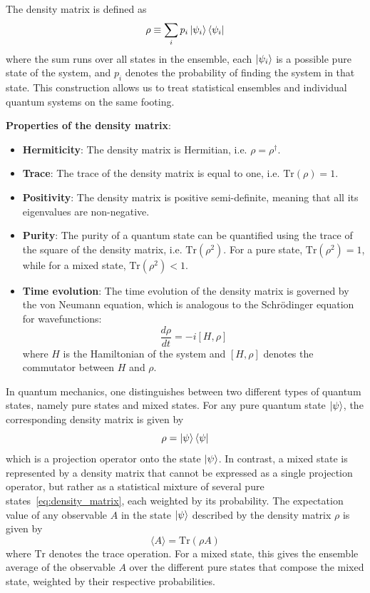 \documentclass[12pt,oneside,openright]{report}
\theoremstyle{definition}
\theoremstyle{plain}
\theoremstyle{remark}
\begin{document}
The density matrix is defined as 
\begin{equation}{\label{eq:density_matrix}}
\rho \equiv \sum_{i} p_i \ket{\psi_i} \bra{\psi_i}
\end{equation}
where the sum runs over all states in the ensemble, each $\ket{\psi_i}$ is a possible pure state of the system, and $p_i$ denotes the probability of
finding the system in that state. This construction allows us to treat statistical ensembles and individual quantum systems on the same footing.

\textbf{Properties of the density matrix}:
\begin{itemize}
\item \textbf{Hermiticity}: The density matrix is Hermitian, i.e. $\rho = \rho^{\dagger}$.
\item \textbf{Trace}: The trace of the density matrix is equal to one, i.e. $\text{Tr}(\rho) = 1$.
\item \textbf{Positivity}: The density matrix is positive semi-definite, meaning that all its eigenvalues are non-negative.
\item \textbf{Purity}: The purity of a quantum state can be quantified using the trace of the square of the density matrix, i.e. $\text{Tr}(\rho^2)$. For a pure state, $\text{Tr}(\rho^2) = 1$, while for a mixed state, $\text{Tr}(\rho^2) < 1$.
\item \textbf{Time evolution}: The time evolution of the density matrix is governed by the von Neumann equation, which is analogous to the Schrödinger equation for wavefunctions:
\begin{equation}
\frac{d\rho}{dt} = -i[H,\rho]
\end{equation}
where $H$ is the Hamiltonian of the system and $[H,\rho]$ denotes the commutator between $H$ and $\rho$.
\end{itemize}
In quantum mechanics, one distinguishes between two different types of quantum states, namely pure states and mixed states.
For any pure quantum state $ \ket{\psi} $, the corresponding density matrix is given by
\begin{equation}
\rho = \ket{\psi} \bra{\psi}
\end{equation}
which is a projection operator onto the state $ \ket{\psi} $. In contrast, a mixed state is represented by 
a density matrix that cannot be expressed as a single projection operator, 
but rather as a statistical mixture of several pure states~\eqref{eq:density_matrix}, each weighted by its probability.
The expectation value of any observable $A$ in the state $\ket{\psi}$ described by the density matrix $\rho$ is given by
\begin{equation}
\langle A \rangle = \text{Tr}(\rho A)
\end{equation}
where $\text{Tr}$ denotes the trace operation.
For a mixed state, this gives the ensemble average of the observable $A$ over the different pure states that compose the mixed state, weighted by their respective probabilities.
\end{document}
